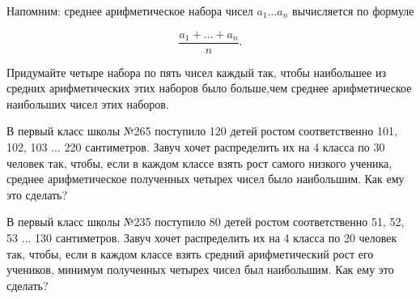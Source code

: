 ﻿
\noindent Напомним: среднее арифметическое набора чисел $a_1 \ldots a_n$ вычисляется по формуле

$$\frac{a_1 + \ldots + a_n}{n}.$$

\begin{enumerate}
\itA Придумайте четыре набора по пять чисел каждый так, чтобы наибольшее из средних арифметических этих наборов было больше,\linebreak чем среднее арифметическое наибольших чисел этих наборов.

\itB В первый класс школы №265 поступило 120 детей ростом соответственно 101, 102, 103 $\ldots$ 220 сантиметров. Завуч хочет распределить их на 4 класса по 30 человек так, чтобы, если в каждом классе взять рост самого низкого ученика, среднее арифметическое полученных четырех чисел было наибольшим. Как ему это сделать?

\itC В первый класс школы №235 поступило 80 детей ростом соответственно 51, 52, 53 $\ldots$ 130 сантиметров. Завуч хочет распределить их на 4 класса по 20 человек так, чтобы, если в каждом классе взять средний арифметический рост его учеников, минимум полученных четырех чисел был наибольшим. Как ему это сделать?
\end{enumerate}